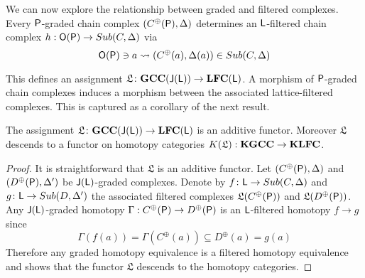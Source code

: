 % 
  
  
 We can now explore the relationship between graded and filtered complexes.  Every ${\mathsf P}$-graded chain complex $(C^\oplus({\mathsf P}),\Delta)$ determines an ${\mathsf L}$-filtered chain complex $h:{\mathsf O}({\mathsf P})\to Sub(C,\Delta)$ via $${\mathsf O}({\mathsf P})\ni a \rightsquigarrow (C^\oplus(a),\Delta(a))\in Sub(C,\Delta)$$


This defines an assignment $\mathfrak{L}\colon {\bf GCC}({\mathsf J}({\mathsf L}))\to {\bf LFC}({\mathsf L})$.  A morphism of ${\mathsf P}$-graded chain complexes induces a morphism between the associated lattice-filtered complexes.  This is captured as a corollary of the next result.


\begin{prop}\label{prop:filt:functor}
The assignment $\mathfrak{L}\colon {\bf GCC}({\mathsf J}({\mathsf L}))\to {\bf LFC}({\mathsf L})$ is an additive functor.  Moreover $\mathfrak{L}$ descends to a functor on homotopy categories $K(\mathfrak{L}):{\bf KGCC}\to {\bf KLFC}$.
\end{prop}
\begin{proof}
It is straightforward that $\mathfrak{L}$ is an additive functor.  Let $(C^\oplus({\mathsf P}),\Delta)$ and  $(D^\oplus({\mathsf P}),\Delta')$  be ${\mathsf J}({\mathsf L})$-graded complexes.  Denote by $f\colon {\mathsf L}\to Sub(C,\Delta)$ and $g\colon {\mathsf L}\to Sub(D,\Delta')$ the associated filtered complexes $\mathfrak{L}(C^\oplus({\mathsf P}))$ and $\mathfrak{L}(D^\oplus({\mathsf P}))$.  Any ${\mathsf J}({\mathsf L})$-graded homotopy $\Gamma:C^\oplus({\mathsf P})\to D^\oplus({\mathsf P})$ is an ${\mathsf L}$-filtered homotopy $f\to g$ since
\[
\Gamma(f(a))= \Gamma(C^\oplus(a)) \subseteq D^\oplus(a) = g(a)
\]
Therefore any graded homotopy equivalence is a filtered homotopy equivalence and  shows that the functor $\mathfrak{L}$ descends to the homotopy categories.
\end{proof}



